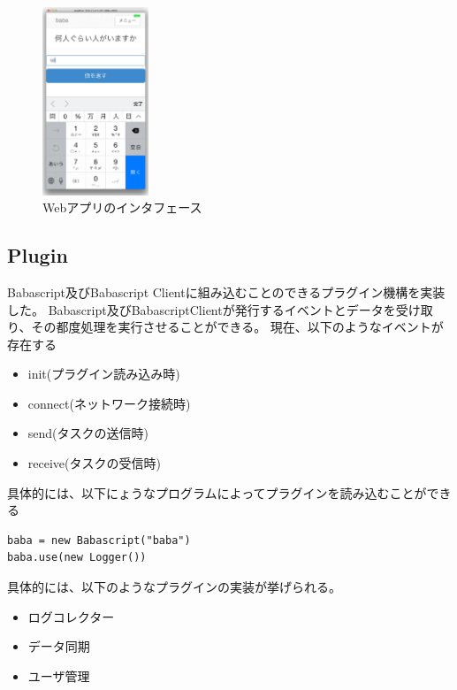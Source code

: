 \begin{figure}[h]
  \centering
  \includegraphics[width=120px]{./images/interface.png}
  \caption{Webアプリのインタフェース}
  \label{webapp-interface}
\end{figure}

\subsection{Plugin}\label{plugin}

Babascript及びBabascript
Clientに組み込むことのできるプラグイン機構を実装した。
Babascript及びBabascriptClientが発行するイベントとデータを受け取り、その都度処理を実行させることができる。
現在、以下のようなイベントが存在する

\begin{itemize}
\itemsep1pt\parskip0pt
\item
  init(プラグイン読み込み時)
\item
  connect(ネットワーク接続時)
\item
  send(タスクの送信時)
\item
  receive(タスクの受信時)
\end{itemize}

具体的には、以下にょうなプログラムによってプラグインを読み込むことができる

\begin{verbatim}
baba = new Babascript("baba")
baba.use(new Logger())
\end{verbatim}

具体的には、以下のようなプラグインの実装が挙げられる。

\begin{itemize}
\itemsep1pt\parskip0pt
\item
  ログコレクター
\item
  データ同期
\item
  ユーザ管理
\end{itemize}

